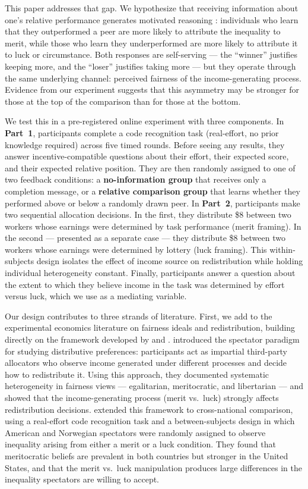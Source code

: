 \documentclass[12pt]{article}
\begin{document}
This paper addresses that gap. We hypothesize that receiving information about one's relative performance generates motivated reasoning \citep{kunda1990}: individuals who learn that they outperformed a peer are more likely to attribute the inequality to merit, while those who learn they underperformed are more likely to attribute it to luck or circumstance. Both responses are self-serving — the ``winner'' justifies keeping more, and the ``loser'' justifies taking more — but they operate through the same underlying channel: perceived fairness of the income-generating process. Evidence from our experiment suggests that this asymmetry may be stronger for those at the top of the comparison than for those at the bottom.

We test this in a pre-registered online experiment with three components. In \textbf{Part~1}, participants complete a code recognition task (real-effort, no prior knowledge required) across five timed rounds. Before seeing any results, they answer incentive-compatible questions about their effort, their expected score, and their expected relative position. They are then randomly assigned to one of two feedback conditions: a \textbf{no-information group} that receives only a completion message, or a \textbf{relative comparison group} that learns whether they performed above or below a randomly drawn peer. In \textbf{Part~2}, participants make two sequential allocation decisions. In the first, they distribute \$8 between two workers whose earnings were determined by task performance (merit framing). In the second — presented as a separate case — they distribute \$8 between two workers whose earnings were determined by lottery (luck framing). This within-subjects design isolates the effect of income source on redistribution while holding individual heterogeneity constant. Finally, participants answer a question about the extent to which they believe income in the task was determined by effort versus luck, which we use as a mediating variable.

Our design contributes to three strands of literature. First, we add to the experimental economics literature on fairness ideals and redistribution, building directly on the framework developed by \citet{cappelen2007} and \citet{almas2020}. \citet{cappelen2007} introduced the spectator paradigm for studying distributive preferences: participants act as impartial third-party allocators who observe income generated under different processes and decide how to redistribute it. Using this approach, they documented systematic heterogeneity in fairness views — egalitarian, meritocratic, and libertarian — and showed that the income-generating process (merit vs.\ luck) strongly affects redistribution decisions. \citet{almas2020} extended this framework to cross-national comparison, using a real-effort code recognition task and a between-subjects design in which American and Norwegian spectators were randomly assigned to observe inequality arising from either a merit or a luck condition. They found that meritocratic beliefs are prevalent in both countries but stronger in the United States, and that the merit vs.\ luck manipulation produces large differences in the inequality spectators are willing to accept.
\end{document}
